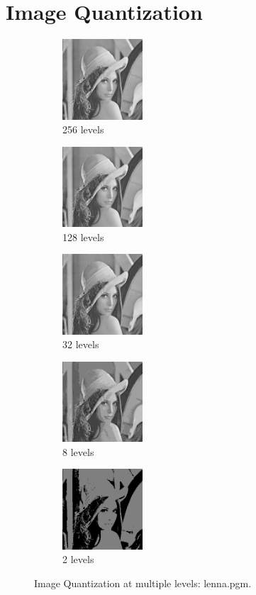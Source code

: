 \documentclass[letterpaper,10pt]{article}
\begin{document}
\section{Image Quantization}
\begin{figure}[hbtp]
  \centering
  \begin{subfigure}{3cm}
    \includegraphics[width=3cm]{images/lenna.png}
    \caption{256 levels}
  \end{subfigure}
  \begin{subfigure}{3cm}
    \includegraphics[width=3cm]{images/lenna_quantization128.png}
    \caption{128 levels}
  \end{subfigure}
  \begin{subfigure}{3cm}
    \includegraphics[width=3cm]{images/lenna_quantization32.png}
    \caption{32 levels}
  \end{subfigure}
  \begin{subfigure}{3cm}
    \includegraphics[width=3cm]{images/lenna_quantization8.png}
    \caption{8 levels}
  \end{subfigure}
  \begin{subfigure}{3cm}
    \includegraphics[width=3cm]{images/lenna_quantization2.png}
    \caption{2 levels}
  \end{subfigure}
  \caption{Image Quantization at multiple levels: lenna.pgm.}
  \label{fig:quantlenna}
\end{figure}
\end{document}
